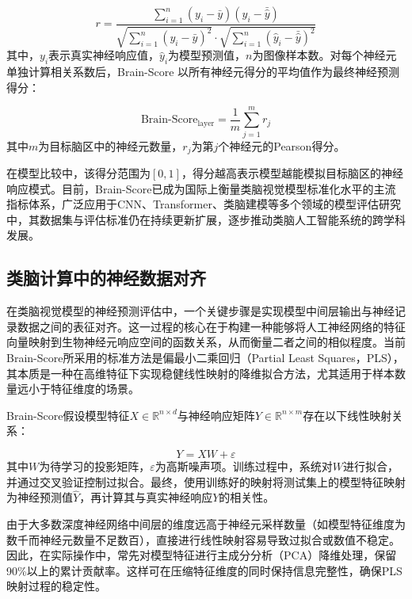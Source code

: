 \begin{equation}
	r = 
	\frac{
		\sum_{i=1}^{n}(y_i - \bar{y})(\hat{y}_i - \bar{\hat{y}})
	}{
		\sqrt{\sum_{i=1}^{n}(y_i - \bar{y})^2} \cdot \sqrt{\sum_{i=1}^{n}(\hat{y}_i - \bar{\hat{y}})^2}
	}
	\label{eq:pearson}
\end{equation}
其中，$y_i$表示真实神经响应值，$\hat{y}_i$为模型预测值，$n$为图像样本数。对每个神经元单独计算相关系数后，Brain-Score 以所有神经元得分的平均值作为最终神经预测得分：

\begin{equation}
	\text{Brain-Score}_{\text{layer}} = \frac{1}{m} \sum_{j=1}^{m} r_j
	\label{eq:brain_score}
\end{equation}
其中$m$为目标脑区中的神经元数量，$r_j$为第$j$个神经元的Pearson得分。

在模型比较中，该得分范围为$[0, 1]$，得分越高表示模型越能模拟目标脑区的神经响应模式。目前，Brain-Score已成为国际上衡量类脑视觉模型标准化水平的主流指标体系，广泛应用于CNN、Transformer、类脑建模等多个领域的模型评估研究中，其数据集与评估标准仍在持续更新扩展，逐步推动类脑人工智能系统的跨学科发展。

\subsection{类脑计算中的神经数据对齐}

在类脑视觉模型的神经预测评估中，一个关键步骤是实现模型中间层输出与神经记录数据之间的表征对齐。这一过程的核心在于构建一种能够将人工神经网络的特征向量映射到生物神经元响应空间的函数关系，从而衡量二者之间的相似程度。当前Brain-Score所采用的标准方法是偏最小二乘回归（Partial Least Squares，PLS），其本质是一种在高维特征下实现稳健线性映射的降维拟合方法，尤其适用于样本数量远小于特征维度的场景\cite{hair2019use}。

Brain-Score假设模型特征$X \in \mathbb{R}^{n \times d}$与神经响应矩阵$Y \in \mathbb{R}^{n \times m}$存在以下线性映射关系：

\begin{equation}
	Y = XW + \varepsilon
	\label{eq:linear_model}
\end{equation}
其中$W$为待学习的投影矩阵，$\varepsilon$为高斯噪声项。训练过程中，系统对$W$进行拟合，并通过交叉验证控制过拟合。最终，使用训练好的映射将测试集上的模型特征映射为神经预测值$\hat{Y}$，再计算其与真实神经响应$Y$的相关性。

由于大多数深度神经网络中间层的维度远高于神经元采样数量（如模型特征维度为数千而神经元数量不足数百），直接进行线性映射容易导致过拟合或数值不稳定。因此，在实际操作中，常先对模型特征进行主成分分析（PCA）降维处理，保留90\%以上的累计贡献率。这样可在压缩特征维度的同时保持信息完整性，确保PLS映射过程的稳定性。

